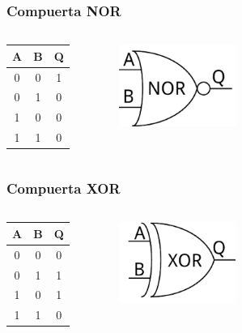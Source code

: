 \documentclass{beamer}
\begin{document}
\begin{frame}
\frametitle{Compuerta NOR}
\begin{columns}[c]
\begin{center}
\begin{tabular}{cc|c}
A & B & Q \\ 
\hline 
0 & 0 & 1 \\  
0 & 1 & 0 \\  
1 & 0 & 0 \\ 
1 & 1 & 0 \\ 
\end{tabular} 
\end{center}
\begin{figure}[!h]
\centering
\includegraphics[width=1.5in]{nor}
\end{figure}
\end{columns}
\end{frame}

\begin{frame}
\frametitle{Compuerta XOR}
\begin{columns}[c]
\begin{center}
\begin{tabular}{cc|c}
A & B & Q \\ 
\hline 
0 & 0 & 0 \\  
0 & 1 & 1 \\  
1 & 0 & 1 \\ 
1 & 1 & 0 \\ 
\end{tabular} 
\end{center}
\begin{figure}[!h]
\centering
\includegraphics[width=1.5in]{xor}
\end{figure}
\end{columns}
\end{frame}
\end{document}
